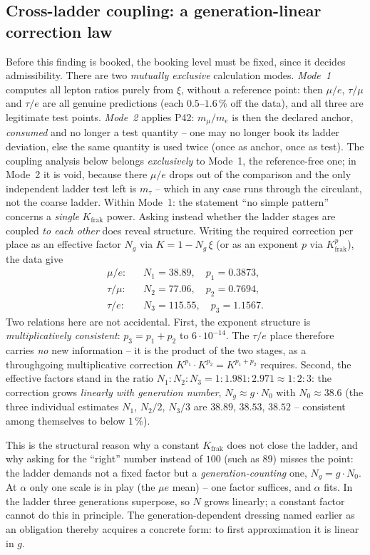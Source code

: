\subsection{Cross-ladder coupling: a generation-linear correction law}
Before this finding is booked, the booking level must be fixed, since it
decides admissibility. There are two \emph{mutually exclusive} calculation
modes. \emph{Mode~1} computes all lepton ratios purely from $\xi$, without a
reference point: then $\mu/e$, $\tau/\mu$ and $\tau/e$ are all genuine
predictions (each $0.5$--$1.6\,\%$ off the data), and all three are
legitimate test points. \emph{Mode~2} applies P42: $m_\mu/m_e$ is then the
declared anchor, \emph{consumed} and no longer a test quantity -- one may no
longer book its ladder deviation, else the same quantity is used twice (once
as anchor, once as test). The coupling analysis below belongs
\emph{exclusively} to Mode~1, the reference-free one; in Mode~2 it is void,
because there $\mu/e$ drops out of the comparison and the only independent
ladder test left is $m_\tau$ -- which in any case runs through the circulant,
not the coarse ladder. Within Mode~1: the statement \enquote{no simple
pattern} concerns a \emph{single} $K_{\text{frak}}$ power. Asking instead whether the ladder stages are
coupled \emph{to each other} does reveal structure. Writing the required
correction per place as an effective factor $N_g$ via $K=1-N_g\,\xi$ (or as
an exponent $p$ via $K_{\text{frak}}^{p}$), the data give
\begin{align}
  \text{$\mu/e$:}\quad & N_1 = 38.89,\quad p_1 = 0.3873,\\
  \text{$\tau/\mu$:}\quad & N_2 = 77.06,\quad p_2 = 0.7694,\\
  \text{$\tau/e$:}\quad & N_3 = 115.55,\quad p_3 = 1.1567.
\end{align}
Two relations here are not accidental. First, the exponent structure is
\emph{multiplicatively consistent}: $p_3 = p_1+p_2$ to $6\cdot10^{-14}$. The
$\tau/e$ place therefore carries \emph{no} new information -- it is the
product of the two stages, as a throughgoing multiplicative correction
$K^{p_1}\cdot K^{p_2}=K^{p_1+p_2}$ requires. Second, the effective factors
stand in the ratio $N_1:N_2:N_3 = 1:1.981:2.971 \approx 1:2:3$: the
correction grows \emph{linearly with generation number},
$N_g \approx g\cdot N_0$ with $N_0 \approx 38.6$ (the three individual
estimates $N_1$, $N_2/2$, $N_3/3$ are $38.89$, $38.53$, $38.52$ --
consistent among themselves to below $1\,\%$).

This is the structural reason why a constant $K_{\text{frak}}$ does not
close the ladder, and why asking for the \enquote{right} number instead of
$100$ (such as $89$) misses the point: the ladder demands not a fixed factor
but a \emph{generation-counting} one, $N_g=g\cdot N_0$. At $\alpha$ only one
scale is in play (the $\mu e$ mean) -- one factor suffices, and $\alpha$
fits. In the ladder three generations superpose, so $N$ grows linearly; a
constant factor cannot do this in principle. The generation-dependent
dressing named earlier as an obligation thereby acquires a concrete
form: to first approximation it is linear in $g$.

